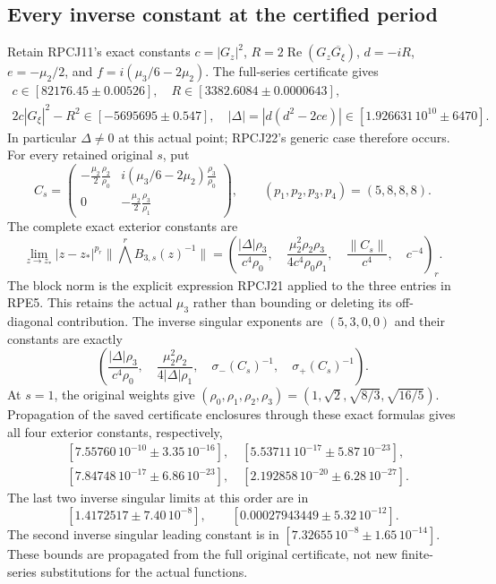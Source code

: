 \subsection{Every inverse constant at the certified period}
Retain RPCJ11's exact constants
$c=|G_z|^2$, $R=2\operatorname{Re}(G_z\overline{G_\xi})$,
$d=-iR$, $e=-\mu_2/2$, and
$f=i(\mu_3/6-2\mu_2)$.
The full-series certificate gives
\[
 \begin{gathered}
 c\in[82176.45\mathbin\pm0.00526],\quad
 R\in[3382.6084\mathbin\pm0.0000643],\\
 2c|G_\xi|^2-R^2\in[-5695695\mathbin\pm0.547],\quad
 |\Delta|=|d(d^2-2ce)|\in[1.926631\,10^{10}\mathbin\pm6470].
 \end{gathered}\tag{RPE4}
\]
In particular $\Delta\ne0$ at this actual point; RPCJ22's generic
case therefore occurs. For every retained original $s$, put
\[
 C_s=\begin{pmatrix}
 -\frac{\mu_2}2\frac{\rho_2}{\rho_0}&
 i(\mu_3/6-2\mu_2)\frac{\rho_3}{\rho_0}\\
 0&-\frac{\mu_2}2\frac{\rho_3}{\rho_1}
 \end{pmatrix},\qquad
 (p_1,p_2,p_3,p_4)=(5,8,8,8).
 \tag{RPE5}
\]
The complete exact exterior constants are
\[
 \lim_{z\to z_*}|z-z_*|^{p_r}\|\bigwedge^rB_{3,s}(z)^{-1}\|
 =\left(
 \frac{|\Delta|\rho_3}{c^4\rho_0},\quad
 \frac{\mu_2^2\rho_2\rho_3}{4c^4\rho_0\rho_1},\quad
 \frac{\|C_s\|}{c^4},\quad c^{-4}
 \right)_r.
 \tag{RPE6}
\]
The block norm is the explicit expression RPCJ21 applied to the
three entries in RPE5. This retains the actual $\mu_3$ rather than
bounding or deleting its off-diagonal contribution.
The inverse singular exponents are $(5,3,0,0)$ and their constants
are exactly
\[
 \left(
 \frac{|\Delta|\rho_3}{c^4\rho_0},\quad
 \frac{\mu_2^2\rho_2}{4|\Delta|\rho_1},\quad
 \sigma_-(C_s)^{-1},\quad\sigma_+(C_s)^{-1}
 \right).
 \tag{RPE7}
\]
At $s=1$, the original weights give
$(\rho_0,\rho_1,\rho_2,\rho_3)=(1,\sqrt2,\sqrt{8/3},\sqrt{16/5})$.
Propagation of the saved certificate enclosures through these exact
formulas gives all four exterior constants, respectively,
\[
 \begin{split}
 &[7.55760\,10^{-10}\mathbin\pm3.35\,10^{-16}],\quad
 [5.53711\,10^{-17}\mathbin\pm5.87\,10^{-23}],\\
 &[7.84748\,10^{-17}\mathbin\pm6.86\,10^{-23}],\quad
 [2.192858\,10^{-20}\mathbin\pm6.28\,10^{-27}].
 \end{split}\tag{RPE8}
\]
The last two inverse singular limits at this order are in
\[
[1.4172517\mathbin\pm7.40\,10^{-8}],\qquad
[0.00027943449\mathbin\pm5.32\,10^{-12}].
\]
The second inverse
singular leading constant is in
$[7.32655\,10^{-8}\mathbin\pm1.65\,10^{-14}]$.
These bounds are propagated from the full original certificate,
not new finite-series substitutions for the actual functions.

